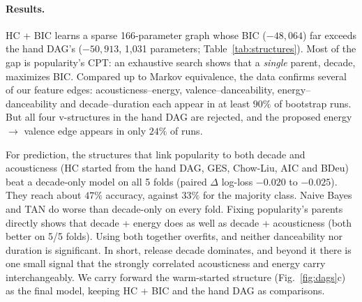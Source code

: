 \begin{table}[t]
  \centering
  \caption{Structures compared on training-set BIC and 5-fold CV prediction of popularity from the other nine variables (add-one smoothed CPTs). HC = Hill Climb. Always predicting the majority class gives a CV accuracy of $0.332$.}
  \label{tab:structures}
  \small
  
\end{table}

\paragraph{Results.}
HC + BIC learns a sparse 166-parameter graph whose BIC ($-48{,}064$) far exceeds the hand DAG's ($-50{,}913$, 1{,}031 parameters; Table~\ref{tab:structures}). Most of the gap is popularity's CPT: an exhaustive search shows that a \emph{single} parent, decade, maximizes BIC. Compared up to Markov equivalence, the data confirms several of our feature edges: acousticness--energy, valence--danceability, energy--danceability and decade--duration each appear in at least $90\%$ of bootstrap runs. But all four v-structures in the hand DAG are rejected, and the proposed energy $\to$ valence edge appears in only $24\%$ of runs.

For prediction, the structures that link popularity to both decade and acousticness (HC started from the hand DAG, GES, Chow-Liu, AIC and BDeu) beat a decade-only model on all 5 folds (paired $\Delta$ log-loss $-0.020$ to $-0.025$). They reach about $47\%$ accuracy, against $33\%$ for the majority class. Naive Bayes and TAN do worse than decade-only on every fold. Fixing popularity's parents directly shows that decade + energy does as well as decade + acousticness (both better on 5/5 folds). Using both together overfits, and neither danceability nor duration is significant. In short, release decade dominates, and beyond it there is one small signal that the strongly correlated acousticness and energy carry interchangeably. We carry forward the warm-started structure (Fig.~\ref{fig:dags}c) as the final model, keeping HC + BIC and the hand DAG as comparisons.
